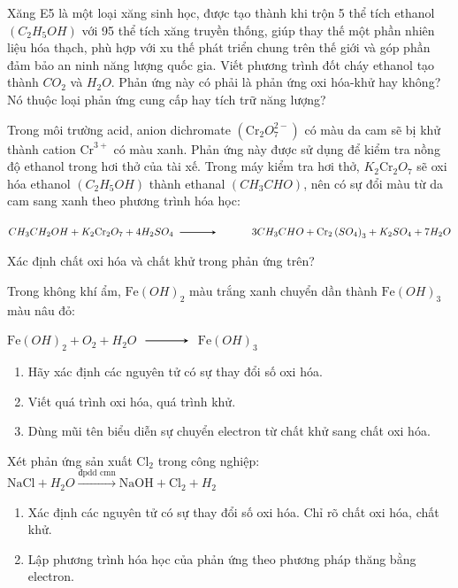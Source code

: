 	\begin{bt}
		Xăng E5 là một loại xăng sinh học, được tạo thành khi trộn 5 thể tích ethanol $\left(C_2H_5OH\right)$ với 95 thể tích xăng truyền thống, giúp thay thế một phần nhiên liệu hóa thạch, phù hợp với xu thế phát triển chung trên thế giới và góp phần đảm bảo an ninh năng lượng quốc gia. Viết phương trình đốt cháy ethanol tạo thành $CO_2$ và $H_2O$. Phản ứng này có phải là phản ứng oxi hóa-khử hay không? Nó thuộc loại phản ứng cung cấp hay tích trữ năng lượng?
		\loigiai{}
	\end{bt}
	\begin{bt}
		Trong môi trường acid, anion dichromate $\left(\mathrm{Cr}_2O_7^{2-}\right)$ có màu da cam sẽ bị khử thành cation $\mathrm{Cr}^{3+}$ có màu xanh. Phản ứng này được sử dụng để kiểm tra nồng độ ethanol trong hơi thở của tài xế. Trong máy kiểm tra hơi thở, $K_2\mathrm{Cr}_2O_7$ sẽ oxi hóa ethanol $\left(C_2H_5OH\right)$ thành ethanal $\left(CH_3CHO\right)$, nên có sự đổi màu từ da cam sang xanh theo phương trình hóa học:
		\begin{center}
			$CH_3 CH_2 OH+K_2\mathrm{Cr}_2O_7+4 H_2 SO_4 \xrightarrow[]{\makebox[1cm]{}} 3 CH_3 CHO+\mathrm{Cr}_2\left(SO_4\right)_3+K_2 SO_4+7 H_2 O$
		\end{center}
		Xác định chất oxi hóa và chất khử trong phản ứng trên?
		\loigiai{}
	\end{bt}
	\begin{bt}
		Trong không khí ẩm, $\mathrm{Fe}(OH)_2$ màu trắng xanh chuyển dần thành $\mathrm{Fe}(OH)_3$ màu nâu đỏ:
		\begin{center}
			$\mathrm{Fe}(OH)_2+O_2+H_2 O $ $\xrightarrow$ $ \mathrm{Fe}(OH)_3$
		\end{center}
		\begin{enumerate}
			\item Hãy xác định các nguyên tử có sự thay đổi số oxi hóa.
			\item Viết quá trình oxi hóa, quá trình khử.
			\item Dùng mũi tên biểu diễn sự chuyển electron từ chất khử sang chất oxi hóa.
		\end{enumerate}
		\loigiai{}
	\end{bt}
	\begin{bt}
		Xét phản ứng sản xuất $\mathrm{Cl}_2$ trong công nghiệp: $\mathrm{NaCl}+H_2O\xrightarrow{\text {đpdd cmn}} \mathrm{NaOH}+\mathrm{Cl}_2+H_2$
		\begin{enumerate}
			\item Xác định các nguyên tử có sự thay đổi số oxi hóa. Chỉ rõ chất oxi hóa, chất khử.
			\item Lập phương trình hóa học của phản ứng theo phương pháp thăng bằng electron.
		\end{enumerate}
		\loigiai{}
	\end{bt}
